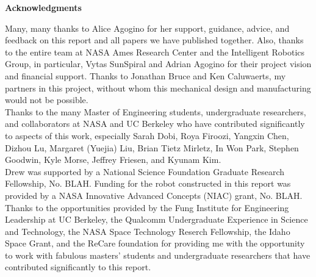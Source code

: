 \documentclass[12pt]{report}
\begin{document}
\begin{center}
\begin{minipage}{0.75\linewidth}
\vspace{4cm}
{\centering \textbf{Acknowledgments} \\[2cm] \par}
Many, many thanks to Alice Agogino for her support, guidance, advice, and feedback on this report and all papers we have published together.
Also, thanks to the entire team at NASA Ames Research Center and the Intelligent Robotics Group, in particular, Vytas SunSpiral and Adrian Agogino for their project vision and financial support.
Thanks to Jonathan Bruce and Ken Caluwaerts, my partners in this project, without whom this mechanical design and manufacturing would not be possible.\\

Thanks to the many Master of Engineering students, undergraduate researchers, and collaborators at NASA and UC Berkeley who have contributed significantly to aspects of this work, especially Sarah Dobi, Roya Firoozi, Yangxin Chen, Dizhou Lu, Margaret (Yuejia) Liu, Brian Tietz Mirletz, In Won Park, Stephen Goodwin, Kyle Morse, Jeffrey Friesen, and Kyunam Kim. \\

Drew was supported by a National Science Foundation Graduate Research Fellowship, No. BLAH. Funding for the robot constructed in this report was provided by a NASA Innovative Advanced Concepts (NIAC) grant, No. BLAH.
Thanks to the opportunities provided by the Fung Institute for Engineering Leadership at UC Berkeley, the Qualcomm Undergraduate Experience in Science and Technology, the NASA Space Technology Reserch Fellowship, the Idaho Space Grant, and the ReCare foundation for providing me with the opportunity to work with fabulous masters' students and undergraduate researchers that have contributed significantly to this report.
\end{minipage}
\end{center}
\clearpage

\tableofcontents
\clearpage



\end{document}
